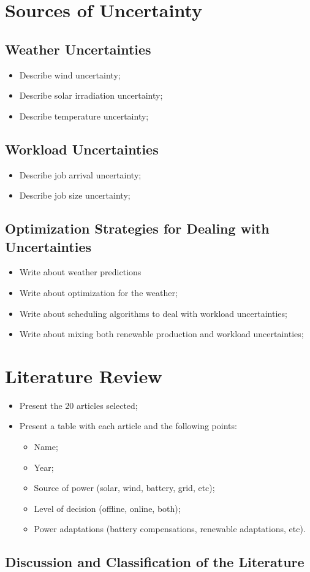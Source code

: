 \section{Sources of Uncertainty}

\subsection{Weather Uncertainties}
\begin{itemize}
    \item Describe wind uncertainty;
    \item Describe solar irradiation uncertainty;
    \item Describe temperature uncertainty;
\end{itemize}

\subsection{Workload Uncertainties}
\begin{itemize}
    \item Describe job arrival uncertainty;
    \item Describe job size uncertainty;
\end{itemize}

\subsection{Optimization Strategies for Dealing with Uncertainties}
\begin{itemize}
    \item Write about weather predictions
    \item Write about optimization for the weather;
    \item Write about scheduling algorithms to deal with workload uncertainties;
    \item Write about mixing both renewable production and workload uncertainties;
\end{itemize}

\section{Literature Review}

\begin{itemize}
    \item Present the 20 articles selected;
    \item Present a table with each article and the following points:
    \begin{itemize}
        \item Name;
        \item Year;
        \item Source of power (solar, wind, battery, grid, etc);
        \item Level of decision (offline, online, both);
        \item Power adaptations (battery compensations, renewable adaptations, etc).
    \end{itemize}
\end{itemize}

\subsection{Discussion and Classification of the Literature}